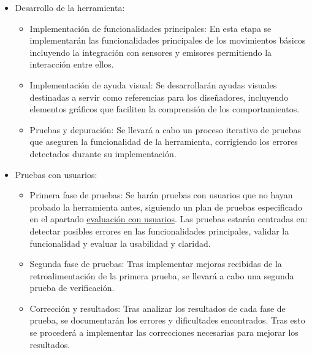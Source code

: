 \begin{itemize}
    \item Desarrollo de la herramienta: 
	\begin{itemize}
	    \item  Implementación de funcionalidades principales: En esta etapa se implementarán las funcionalidades principales de los movimientos básicos incluyendo la integración con sensores y emisores permitiendo la interacción entre ellos.
	    \item Implementación de ayuda visual: Se desarrollarán ayudas visuales destinadas a servir como referencias para los diseñadores, incluyendo elementos gráficos que faciliten la comprensión de los comportamientos. 
	    \item Pruebas y depuración: Se llevará a cabo un proceso iterativo de pruebas que aseguren la funcionalidad de la herramienta, corrigiendo los errores detectados durante su implementación.
	\end{itemize}
    \item Pruebas con usuarios:
	\begin{itemize}
	    \item Primera fase de pruebas: Se harán pruebas con usuarios que no hayan probado la herramienta antes, siguiendo un plan de pruebas especificado en el apartado \hyperref[cap:evaluacionConUsuarios]{evaluación con usuarios}. Las pruebas estarán centradas en: detectar posibles errores en las funcionalidades principales, validar la funcionalidad y evaluar la usabilidad y claridad.
	    \item Segunda fase de pruebas: Tras implementar mejoras recibidas de la retroalimentación de la primera prueba, se llevará a cabo una segunda prueba de verificación.
	    \item Corrección y resultados: Tras analizar los resultados de cada fase de prueba, se documentarán los errores y dificultades encontrados. Tras esto se procederá a implementar las correcciones necesarias para mejorar los resultados. 
	\end{itemize}

\end{itemize}
